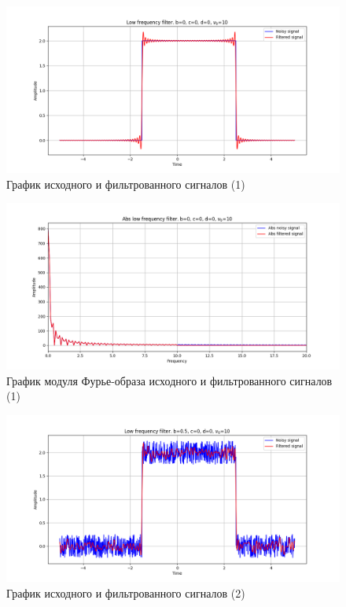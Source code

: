 \documentclass[a4paper, 12pt]{article}
\begin{document}
    \begin{figure}[H]
        \centering
        \includegraphics[scale=0.48]{1_nohigh.png}
        \captionsetup{skip=0pt}
        \caption{График исходного и фильтрованного сигналов (1)}
        \label{fig:fig1}
    \end{figure}
    \begin{figure}[H]
        \centering
        \includegraphics[scale=0.48]{1_abs_nohigh.png}
        \captionsetup{skip=0pt}
        \caption{График модуля Фурье-образа исходного и фильтрованного сигналов (1)}
        \label{fig:fig2}
    \end{figure}
    \begin{figure}[H]
        \centering
        \includegraphics[scale=0.48]{2_nohigh.png}
        \captionsetup{skip=0pt}
        \caption{График исходного и фильтрованного сигналов (2)}
        \label{fig:fig3}
    \end{figure}
\end{document}
